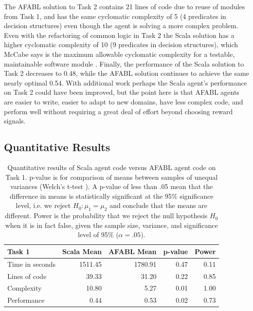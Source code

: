 The AFABL solution to Task 2 contains 21 lines of code due to reuse of modules from Task 1, and has the same cyclomatic complexity of 5 (4 predicates in decision structures) even though the agent is solving a more complex problem. Even with the refactoring of common logic in Task 2 the Scala solution has a higher cyclomatic complexity of 10 (9 predicates in decision structures), which McCabe says is the maximum allowable cyclomatic complexity for a testable, maintainable software module \cite{mccabe1976complexity}. Finally, the performance of the Scala solution to Task 2 decreases to 0.48, while the AFABL solution continues to achieve the same nearly optimal 0.54. With additional work perhaps the Scala agent's performance on Task 2 could have been improved, but the point here is that AFABL agents are easier to write, easier to adapt to new domains, have less complex code, and perform well without requiring a great deal of effort beyond choosing reward signals.

\subsection{Quantitative Results}

\begin{center}
\begin{table}[h]
\begin{center}

\begin{tabular}{|l|r|r|r|r|}\hline
Task 1 & Scala Mean & AFABL Mean & p-value & Power \\\hline
Time in seconds & 1511.45 & 1780.91 & 0.47 & 0.11\\
Lines of code & 39.33 & 31.20 & 0.22 & 0.85\\
Complexity & 10.80 & 5.27 & 0.01 & 1.00\\
Performance & 0.44 & 0.53 & 0.02 & 0.73\\
\hline
\end{tabular}

\end{center}
\caption{Quantitative results of Scala agent code versus AFABL agent code on Task 1. p-value is for comparison of means between samples of unequal variances (Welch's t-test \cite{welch1947generalization}). A p-value of less than .05 mean that the difference in means is statistically significant at the 95\% significance level, i.e. we reject $H_0: \mu_1 = \mu_2$ and conclude that the means are different. Power is the probability that we reject the null hypothesis $H_0$ when it is in fact false, given the sample size, variance, and significance level of 95\% ($\alpha = .05$).}
\label{tbl:task1-results}
\end{table}
\end{center}

